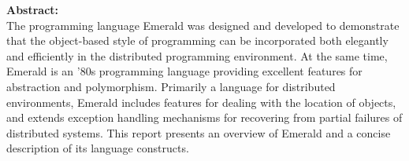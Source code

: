 \begin{titlepage}
\begin{center}
\parbox{6.0in}{
{\bf Abstract:}\\[0.15in]
The programming language Emerald was designed and developed 
to demonstrate that the
object-based style of programming can be incorporated both elegantly and
efficiently in the distributed programming environment.
At the same time, Emerald is an '80s programming language providing excellent
features for abstraction and polymorphism. Primarily a language for
distributed environments, Emerald includes features for dealing
with the location of objects,
and extends exception handling mechanisms for recovering from partial failures
of distributed systems. This report presents an overview of
Emerald and a concise description of its language constructs.
}
\end{center}
\vspace*{0.2in}
\mbox{}
\end{titlepage}
\addtocounter{footnote}{-2}
